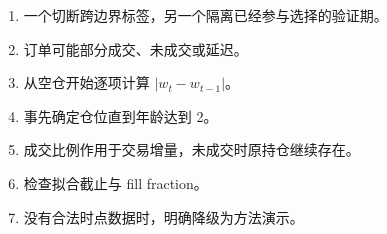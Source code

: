 \begin{enumerate}[leftmargin=*]
  \item 一个切断跨边界标签，另一个隔离已经参与选择的验证期。
  \item 订单可能部分成交、未成交或延迟。
  \item 从空仓开始逐项计算 $|w_t-w_{t-1}|$。
  \item 事先确定仓位直到年龄达到 2。
  \item 成交比例作用于交易增量，未成交时原持仓继续存在。
  \item 检查拟合截止与 fill fraction。
  \item 没有合法时点数据时，明确降级为方法演示。
\end{enumerate}
